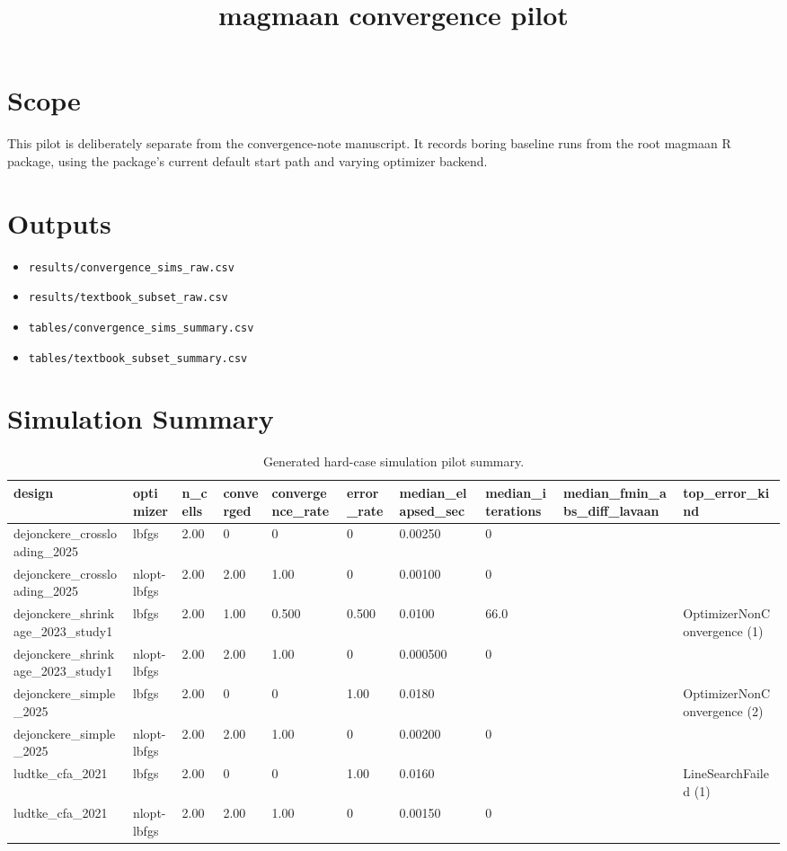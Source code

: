 \documentclass[11pt]{article}
\title{magmaan convergence pilot}
\date{}
\begin{document}
\maketitle
\section*{Scope}
This pilot is deliberately separate from the convergence-note manuscript. It records boring baseline runs from the root magmaan R package, using the package's current default start path and varying optimizer backend.
\section*{Outputs}
\begin{itemize}
\item \texttt{results/convergence\_sims\_raw.csv}
\item \texttt{results/textbook\_subset\_raw.csv}
\item \texttt{tables/convergence\_sims\_summary.csv}
\item \texttt{tables/textbook\_subset\_summary.csv}
\end{itemize}
\section*{Simulation Summary}
\begin{table}[ht]
\centering
\caption{Generated hard-case simulation pilot summary.}
\begin{tabular}{llllllllll}
\hline
design & optimizer & n\_cells & converged & convergence\_rate & error\_rate & median\_elapsed\_sec & median\_iterations & median\_fmin\_abs\_diff\_lavaan & top\_error\_kind
\\ \hline
dejonckere\_crossloading\_2025 & lbfgs & 2.00 & 0 & 0 & 0 & 0.00250 & 0 &  &  \\
dejonckere\_crossloading\_2025 & nlopt-lbfgs & 2.00 & 2.00 & 1.00 & 0 & 0.00100 & 0 &  &  \\
dejonckere\_shrinkage\_2023\_study1 & lbfgs & 2.00 & 1.00 & 0.500 & 0.500 & 0.0100 & 66.0 &  & OptimizerNonConvergence (1) \\
dejonckere\_shrinkage\_2023\_study1 & nlopt-lbfgs & 2.00 & 2.00 & 1.00 & 0 & 0.000500 & 0 &  &  \\
dejonckere\_simple\_2025 & lbfgs & 2.00 & 0 & 0 & 1.00 & 0.0180 &  &  & OptimizerNonConvergence (2) \\
dejonckere\_simple\_2025 & nlopt-lbfgs & 2.00 & 2.00 & 1.00 & 0 & 0.00200 & 0 &  &  \\
ludtke\_cfa\_2021 & lbfgs & 2.00 & 0 & 0 & 1.00 & 0.0160 &  &  & LineSearchFailed (1) \\
ludtke\_cfa\_2021 & nlopt-lbfgs & 2.00 & 2.00 & 1.00 & 0 & 0.00150 & 0 &  &  \\
\hline
\end{tabular}
\end{table}
\end{document}
